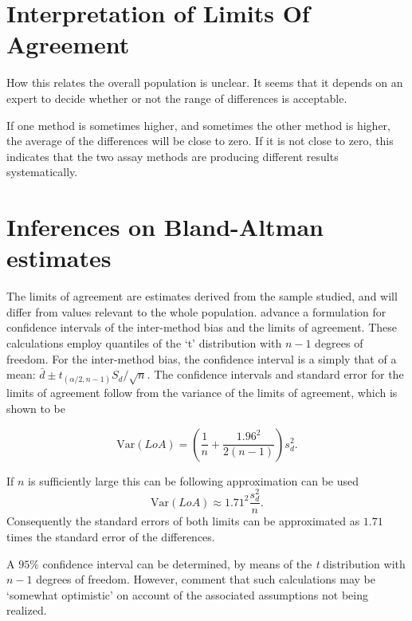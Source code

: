 \documentclass[12pt, a4paper]{report}
\theoremstyle{plain}
\theoremstyle{definition}
\theoremstyle{remark}
\begin{document}
\section{Interpretation of Limits Of Agreement}

How this relates the overall population is unclear. It seems that it depends on an expert to decide whether or not the range of differences is acceptable. 

If one method is sometimes higher, and sometimes the other method is higher, the average of the differences will be close to zero. If it is not close to zero, this indicates that the two assay methods are producing different results systematically.



\section{Inferences on Bland-Altman estimates}
	The limits of agreement are estimates derived from the sample studied, and will differ from values relevant to the whole
	population. \citet*{BA86} advance a formulation for confidence
	intervals of the inter-method bias and the limits of agreement.
	These calculations employ quantiles of the `t' distribution with $n -1$ degrees of freedom. For the inter-method bias, the confidence interval is a simply that of a mean: $\bar{d} \pm t_{(\alpha/2,n-1)} S_{d}/\sqrt{n}$.
	The confidence
	intervals and standard error for the limits of agreement follow from the variance of the limits of agreement, which is shown to be
	
	\[
	\mbox{Var}(LoA) = (\frac{1}{n}+\frac{1.96^{2}}{2(n-1)})s_{d}^{2}.
	\]
	
	If $n$ is sufficiently large this can be following approximation can be used
	\[
	\mbox{Var}(LoA) \approx 1.71^{2}\frac{s_{d}^{2}}{n}.
	\]
	Consequently the standard errors of both limits can be approximated as $1.71$ times the standard error of the differences.
	
	A $95\%$ confidence interval can be determined, by means of the \emph{t} distribution with $n-1$ degrees of freedom. However, \citet*{BA99} comment that such calculations  may be `somewhat optimistic' on account of the associated assumptions not being realized.
	
	
\end{document}
